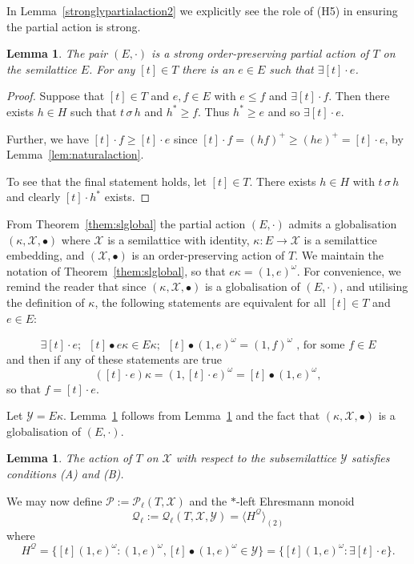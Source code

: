 \documentclass[12pt]{amsart}
\newtheorem{lem}[them]{Lemma}
\theoremstyle{definition}
\theoremstyle{definition}
\numberwithin{them}{section}
\numberwithin{equation}{section}
\newcommand{\QQ}{\mbox{$\mathcal{Q}_\ell$}}
\newcommand{\X}{\mathcal{X}}
\newcommand{\Y}{\mathcal{Y}}
\begin{document}
{{In Lemma~\ref{stronglypartialaction2}
we explicitly see the role of (H5) in ensuring the partial action is strong.


\begin{lem}\label{stronglypartialaction}  The  pair $(E,\cdot)$  is a strong order-preserving partial action of  $T$  on the semilattice $E$.   For any $[t]\in T$ there is an $e\in E$ such that $\exists [t]\cdot e$.
\end{lem}
\begin{proof} 
Suppose that $[t]\in T$ and $e, f\in E$ with $e \leq f$ and  $\exists [t] \cdot f$. Then there exists $h \in H$ such that $t\, \sigma\, h$ and $h^\ast \geq f$.   Thus   $h^{\ast} \geq e$ and so $\exists [t] \cdot e$.

Further,  we have $[t] \cdot f \geq [t] \cdot e$ since $[t] \cdot f = (hf)^+ \geq (he)^+ =[t] \cdot e$, by Lemma~\ref{lem:naturalaction}.

To see that the final statement holds, let $[t]\in T$. There exists $h\in H$ with $t\,\sigma\, h$ and clearly
$[t]\cdot h^*$ exists.
\end{proof}



From Theorem~\ref{them:slglobal}  the partial action $(E, \cdot)$ admits a globalisation $(\kappa, \mathcal{X}, \bullet)$ where $\mathcal{X}$ is a semilattice with identity, $\kappa:E\rightarrow \X$ is a semilattice embedding,   and $(\mathcal{X},\bullet)$ is an order-preserving action  of $T$. We maintain the notation of Theorem~\ref{them:slglobal}, so that $e\kappa=(1,e)^\omega$.
For convenience, we remind the reader that since  $(\kappa, \mathcal{X}, \bullet)$ is a globalisation of $(E,\cdot)$, and utilising the definition of $\kappa$, the following statements are equivalent for all $[t]\in T$ and $e\in E$:


\[
\exists [t]\cdot e;\,\,\,  [t]\bullet e\kappa\in E\kappa;\,\,\, 
[t]\bullet (1,e)^\omega=(1,f)^\omega\mbox{ , for some }f\in E\]
and then if any of these statements are true
\[ ([t]\cdot e)\kappa=(1, [t]\cdot e)^\omega=[t]\bullet (1,e)^\omega,\]
so that $f=[t]\cdot e.$ 


Let $\Y=E\kappa$.
 Lemma~\ref{lem:andb}  follows from Lemma~\ref{stronglypartialaction} and  the fact that $(\kappa, \mathcal{X}, \bullet)$ is a globalisation of $(E, \cdot)$.

\begin{lem}\label{lem:andb}
The action of $T$ on $\mathcal{X}$ with respect to the subsemilattice $\Y$ satisfies conditions (A) and (B).
\end{lem}
We may now define $\mathcal{P}:=\mathcal{P}_{\ell}(T,\X)$ 
and the $*$-left Ehresmann monoid  
$$\QQ:=\QQ(T, \X,\Y)=\langle H^{\mathcal{Q}}\rangle_{(2)}$$
where 
\[H^{\mathcal{Q}}=\{ [t](1,e)^\omega: (1,e)^\omega,   [t]\bullet (1,e)^\omega \in \mathcal{Y}\}=\{[t](1,e)^\omega: \exists [t]\cdot e\}. \]


}}
\end{document}
